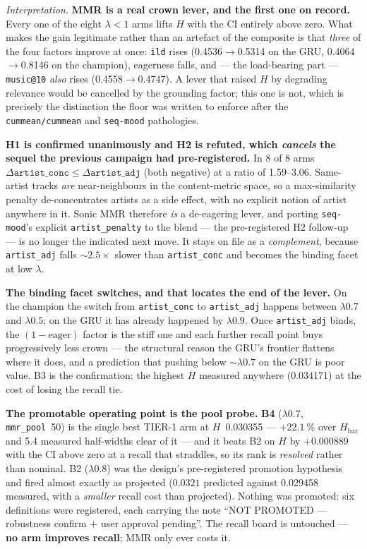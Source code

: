 \documentclass[11pt]{article}
\begin{document}
\emph{Interpretation.} \textbf{MMR is a real crown lever, and the first one on
record.} Every one of the eight $\lambda<1$ arms lifts $H$ with the CI entirely
above zero. What makes the gain legitimate rather than an artefact of the
composite is that \emph{three} of the four factors improve at once: \texttt{ild}
rises (\num{0.4536}$\to$\num{0.5314} on the GRU, \num{0.4064}$\to$\num{0.8146} on
the champion), eagerness falls, and --- the load-bearing part ---
\texttt{music@10} \emph{also} rises (\num{0.4558}$\to$\num{0.4747}). A lever that
raised $H$ by degrading relevance would be cancelled by the grounding factor; this
one is not, which is precisely the distinction the floor was written to enforce
after the \texttt{cummean/cummean} and \texttt{seq-mood} pathologies.

\textbf{H1 is confirmed unanimously and H2 is refuted, which \emph{cancels} the
sequel the previous campaign had pre-registered.} In 8 of 8 arms
$\Delta\texttt{artist\_conc} \le \Delta\texttt{artist\_adj}$ (both negative) at a
ratio of \numrange{1.59}{3.06}. Same-artist tracks \emph{are} near-neighbours in
the content-metric space, so a max-similarity penalty de-concentrates artists as a
side effect, with no explicit notion of artist anywhere in it. Sonic MMR
therefore \emph{is} a de-eagering lever, and porting \texttt{seq-mood}'s explicit
\texttt{artist\_penalty} to the blend --- the pre-registered H2 follow-up --- is no
longer the indicated next move. It stays on file as a \emph{complement}, because
\texttt{artist\_adj} falls ${\sim}\num{2.5}\times$ slower than
\texttt{artist\_conc} and becomes the binding facet at low $\lambda$.

\textbf{The binding facet switches, and that locates the end of the lever.} On the
champion the switch from \texttt{artist\_conc} to \texttt{artist\_adj} happens
between $\lambda\num{0.7}$ and $\lambda\num{0.5}$; on the GRU it has already
happened by $\lambda\num{0.9}$. Once \texttt{artist\_adj} binds, the
$(1-\text{eager})$ factor is the stiff one and each further recall point buys
progressively less crown --- the structural reason the GRU's frontier flattens
where it does, and a prediction that pushing below ${\sim}\lambda\num{0.7}$ on the
GRU is poor value. B3 is the confirmation: the highest $H$ measured anywhere
(\num{0.034171}) at the cost of losing the recall tie.

\textbf{The promotable operating point is the pool probe.} \textbf{B4}
($\lambda\num{0.7}$, \texttt{mmr\_pool}~\num{50}) is the single best TIER-1 arm at
$H$~\num{0.030355} --- $+\SI{22.1}{\percent}$ over $H_{\mathrm{bar}}$ and
\num{5.4} measured half-widths clear of it --- and it beats B2 on $H$ by
$+\num{0.000889}$ with the CI above zero at a recall that straddles, so its rank
is \emph{resolved} rather than nominal. B2 ($\lambda\num{0.8}$) was the design's
pre-registered promotion hypothesis and fired almost exactly as projected
($\num{0.0321}$ predicted against \num{0.029458} measured, with a \emph{smaller}
recall cost than projected). Nothing was promoted: six definitions were
registered, each carrying the note ``NOT PROMOTED --- robustness confirm $+$ user
approval pending''. The recall board is untouched --- \textbf{no arm improves
recall}; MMR only ever costs it.
\end{document}
